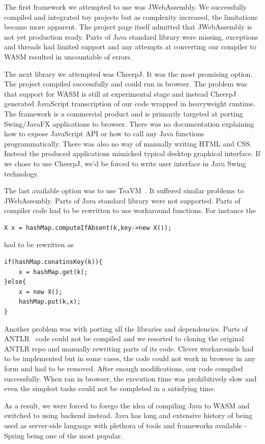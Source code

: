 The first framework we attempted to use was JWebAssembly. We successfully compiled and integrated toy projects but as complexity increased, the limitations became more apparent. The project page itself admitted that JWebAssembly is not yet production ready. Parts of Java standard library were missing, exceptions and threads had limited support and any attempts at converting our compiler to WASM resulted in uncountable of errors.

The next library we attempted was CheerpJ. It was the most promising option. The project compiled successfully and could run in browser. The problem was that support for WASM is still at experimental stage and instead CheerpJ generated JavaScript transcription of our code wrapped in heavyweight runtime. The framework is a commercial product and is primarily targeted at porting Swing/JavaFX applications to browser. There was no documentation explaining how to expose JavaScript API or how to call any Java functions programmatically. There was also no way of manually writing HTML and CSS. Instead the produced applications mimicked typical desktop graphical interface. If we chose to use CheerpJ, we'd be forced to write user interface in Java Swing technology.

The last available option was to use TeaVM\  \cite{teavm}. It suffered similar problems to JWebAssembly. Parts of Java standard library were not supported. Parts of compiler code had to be rewritten to use workaround functions. For instance
the
\begin{lstlisting}
X x = hashMap.computeIfAbsent(k,key->new X());
\end{lstlisting}
had to be rewritten as
\begin{lstlisting}
if(hashMap.conatinsKey(k)){
    x = hashMap.get(k);
}else{
    x = new X();
    hashMap.put(k,x);
}
\end{lstlisting}
Another problem was with porting all the libraries and dependencies.
Parts of ANTLR\  \cite{antlr} code could not be compiled and we resorted to cloning the original ANTLR repo and manually rewriting parts of its code. Clever workarounds had to be implemented but in some cases, the code could not work in browser in any form and had to be removed.
After enough modifications, our code compiled successfully.
When ran in browser, the execution time was prohibitively slow and even the simplest tasks could not be completed in a satisfying time.

As a result, we were forced to forego the idea of compiling Java to WASM and switched to using backend instead. Java has long and extensive history of being used as server-side language with plethora of tools and frameworks available - Spring being one of the most popular.